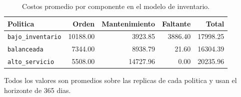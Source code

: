 \begin{table}[htbp]
\centering
\caption{Costos promedio por componente en el modelo de inventario.}
\label{tab:inventario-costos}
\begin{tabular}{lrrrr}
\toprule
Politica & Orden & Mantenimiento & Faltante & Total \\
\midrule
\texttt{bajo\_inventario} & 10188.00 & 3923.85 & 3886.40 & 17998.25 \\
\texttt{balanceada} & 7344.00 & 8938.79 & 21.60 & 16304.39 \\
\texttt{alto\_servicio} & 5508.00 & 14727.96 & 0.00 & 20235.96 \\
\bottomrule
\end{tabular}
\par\smallskip
\begin{minipage}{0.95\linewidth}
\centering\footnotesize
Todos los valores son promedios sobre las replicas de cada politica y usan el horizonte de 365 dias.
\end{minipage}
\end{table}
